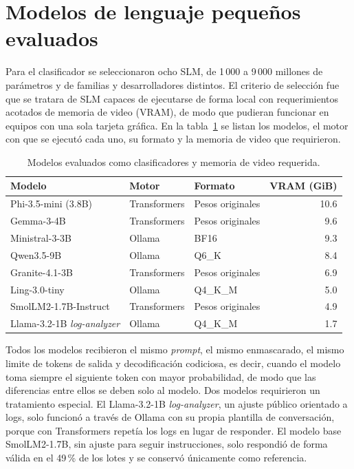 \section{Modelos de lenguaje pequeños evaluados}\label{sec:met_slm}

Para el clasificador se seleccionaron ocho SLM, de 1\,000 a 9\,000 millones de parámetros y de familias y desarrolladores distintos. El criterio de selección fue que se tratara de SLM capaces de ejecutarse de forma local con requerimientos acotados de memoria de video (VRAM), de modo que pudieran funcionar en equipos con una sola tarjeta gráfica. En la tabla~\ref{tab:met_modelos} se listan los modelos, el motor con que se ejecutó cada uno, su formato y la memoria de video que requirieron.

\begin{table}[H]
\centering
\caption{Modelos evaluados como clasificadores y memoria de video requerida.}
\label{tab:met_modelos}
\small
\begin{tabular}{@{}lllr@{}}
\toprule
\textbf{Modelo} & \textbf{Motor} & \textbf{Formato} & \textbf{VRAM (GiB)} \\
\midrule
Phi-3.5-mini (3.8B) & Transformers & Pesos originales & 10.6 \\
Gemma-3-4B & Transformers & Pesos originales & 9.6 \\
Ministral-3-3B & Ollama & BF16 & 9.3 \\
Qwen3.5-9B & Ollama & Q6\_K & 8.4 \\
Granite-4.1-3B & Transformers & Pesos originales & 6.9 \\
Ling-3.0-tiny & Ollama & Q4\_K\_M & 5.0 \\
SmolLM2-1.7B-Instruct & Transformers & Pesos originales & 4.9 \\
Llama-3.2-1B \textit{log-analyzer} & Ollama & Q4\_K\_M & 1.7 \\
\bottomrule
\end{tabular}
\normalsize
\end{table}

Todos los modelos recibieron el mismo \textit{prompt}, el mismo enmascarado, el mismo limite de tokens de salida y decodificación codiciosa, es decir, cuando el modelo toma siempre el siguiente token con mayor probabilidad, de modo que las diferencias entre ellos se deben solo al modelo. Dos modelos requirieron un tratamiento especial. El Llama-3.2-1B \textit{log-analyzer}, un ajuste público orientado a logs, solo funcionó a través de Ollama con su propia plantilla de conversación, porque con Transformers repetía los logs en lugar de responder. El modelo base SmolLM2-1.7B, sin ajuste para seguir instrucciones, solo respondió de forma válida en el 49\,\% de los lotes y se conservó únicamente como referencia.

